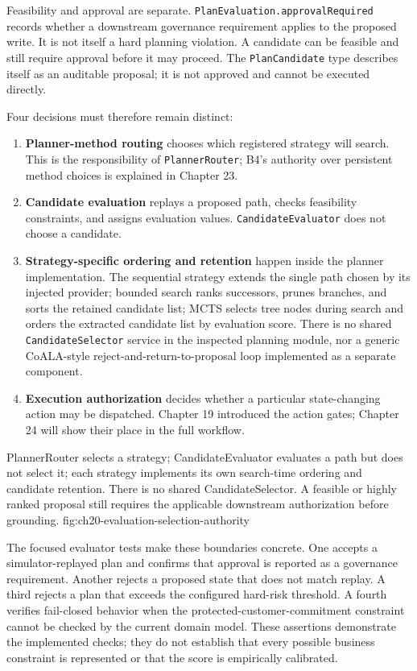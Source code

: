 Feasibility and approval are separate. \texttt{PlanEvaluation.approvalRequired} records whether a downstream governance requirement applies to the proposed write. It is not itself a hard planning violation. A candidate can be feasible and still require approval before it may proceed. The \texttt{PlanCandidate} type describes itself as an auditable proposal; it is not approved and cannot be executed directly.

Four decisions must therefore remain distinct:

\begin{enumerate}
  \item \textbf{Planner-method routing} chooses which registered strategy will search. This is the responsibility of \texttt{PlannerRouter}; B4's authority over persistent method choices is explained in Chapter 23.
  \item \textbf{Candidate evaluation} replays a proposed path, checks feasibility constraints, and assigns evaluation values. \texttt{CandidateEvaluator} does not choose a candidate.
  \item \textbf{Strategy-specific ordering and retention} happen inside the planner implementation. The sequential strategy extends the single path chosen by its injected provider; bounded search ranks successors, prunes branches, and sorts the retained candidate list; MCTS selects tree nodes during search and orders the extracted candidate list by evaluation score. There is no shared \texttt{CandidateSelector} service in the inspected planning module, nor a generic CoALA-style reject-and-return-to-proposal loop implemented as a separate component.
  \item \textbf{Execution authorization} decides whether a particular state-changing action may be dispatched. Chapter 19 introduced the action gates; Chapter 24 will show their place in the full workflow.
\end{enumerate}

  {PlannerRouter selects a strategy; CandidateEvaluator evaluates a path but does not select it; each strategy implements its own search-time ordering and candidate retention. There is no shared CandidateSelector. A feasible or highly ranked proposal still requires the applicable downstream authorization before grounding.}
  {fig:ch20-evaluation-selection-authority}

The focused evaluator tests make these boundaries concrete. One accepts a simulator-replayed plan and confirms that approval is reported as a governance requirement. Another rejects a proposed state that does not match replay. A third rejects a plan that exceeds the configured hard-risk threshold. A fourth verifies fail-closed behavior when the protected-customer-commitment constraint cannot be checked by the current domain model. These assertions demonstrate the implemented checks; they do not establish that every possible business constraint is represented or that the score is empirically calibrated.

